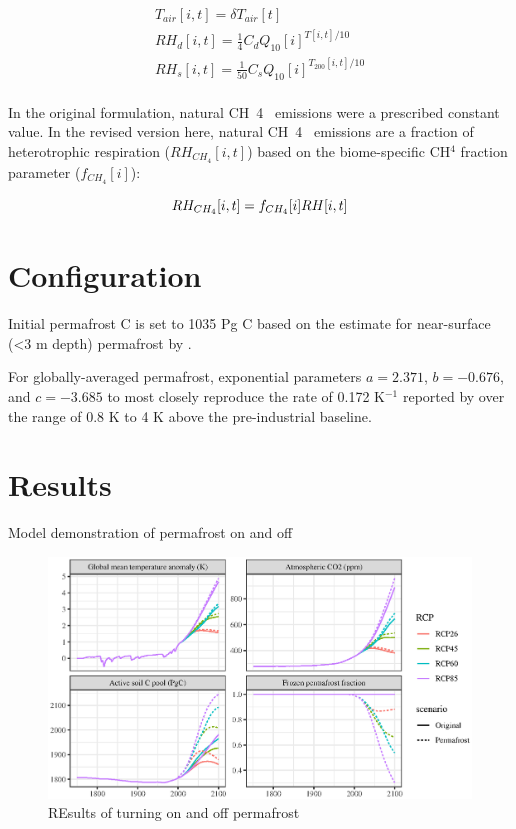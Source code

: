 \documentclass[essd, manuscript]{copernicus}
\begin{document}
\begin{gather*}
T_{air}[i,t] = \delta T_{air}[t] \\
RH_d[i,t] = \frac{1}{4} C_d Q_{10}[i] ^ {{T}[i,t] / 10} \\
RH_s[i,t] = \frac{1}{50} C_s Q_{10}[i] ^ {T_{200}[i,t] / 10} \\
\end{gather*}

In the original formulation, natural CH~4~ emissions were a prescribed constant value.
In the revised version here, natural CH~4~ emissions are a fraction of heterotrophic respiration ($RH_{CH_4}[i,t]$) based on the biome-specific CH$^4$ fraction parameter ($f_{CH_4}[i]$):

\begin{equation*}
    RH_{CH_4}[i,t] = f_{CH_4}[i] RH[i,t] \\
\end{equation*}

\section{Configuration}
Initial permafrost C is set to 1035 Pg C based on the estimate for near-surface (<3 m depth) permafrost by \citet{hugelius_2014_estimated}.


For globally-averaged permafrost, exponential parameters $a = 2.371$, $b = -0.676$, and $c = -3.685$ to most closely reproduce the rate of 0.172 K$^{-1}$ reported by \citet{kessler_2017_estimating} over the range of 0.8 K \footnotemark to 4 K above the pre-industrial baseline.


\section{Results}
Model demonstration of permafrost on and off
\begin{figure}
    \centering
    \includegraphics[width=\textwidth]{figures/hector_4panel_results.eps}
    \caption{REsults of turning on and off permafrost}
    \label{fig:4panel}
\end{figure}
\end{document}
